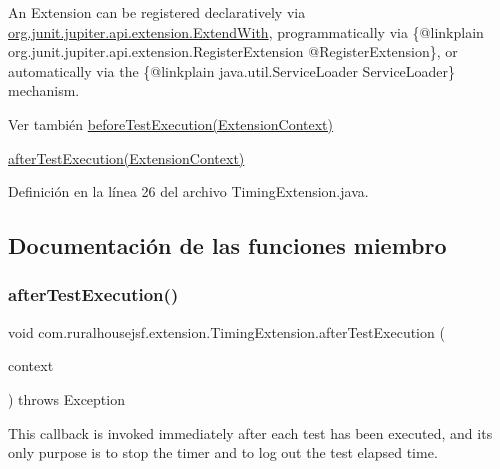 An Extension can be registered {\ttfamily declaratively} via \mbox{\hyperlink{}{org.\+junit.\+jupiter.\+api.\+extension.\+Extend\+With}}, {\ttfamily programmatically} via \{@linkplain org.\+junit.\+jupiter.\+api.\+extension.\+Register\+Extension @\+Register\+Extension\}, or {\ttfamily automatically} via the \{@linkplain java.\+util.\+Service\+Loader Service\+Loader\} mechanism.

\begin{DoxySeeAlso}{Ver también}
\mbox{\hyperlink{classcom_1_1ruralhousejsf_1_1extension_1_1_timing_extension_ad19d0a2513bd9041f9263c1d9536ed6c}{before\+Test\+Execution(\+Extension\+Context)}} 

\mbox{\hyperlink{classcom_1_1ruralhousejsf_1_1extension_1_1_timing_extension_a300725ce5f0290e9878185e05d84c019}{after\+Test\+Execution(\+Extension\+Context)}} 
\end{DoxySeeAlso}


Definición en la línea 26 del archivo Timing\+Extension.\+java.



\subsection{Documentación de las funciones miembro}
\mbox{\label{classcom_1_1ruralhousejsf_1_1extension_1_1_timing_extension_a300725ce5f0290e9878185e05d84c019}} 
\subsubsection{\texorpdfstring{afterTestExecution()}{afterTestExecution()}}
{\footnotesize\ttfamily void com.\+ruralhousejsf.\+extension.\+Timing\+Extension.\+after\+Test\+Execution (\begin{DoxyParamCaption}\item[{Extension\+Context}]{context }\end{DoxyParamCaption}) throws Exception}



This callback is invoked {\ttfamily immediately after} each test has been executed, and its only purpose is to stop the timer and to log out the test elapsed time. 

